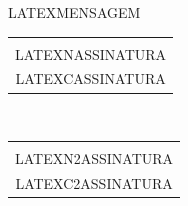 \documentclass[12pt]{artigo_novo}
\begin{document}
\vspace*{.8cm}
\timbrado
\noindent
\begin{linenumbers}
LATEXMENSAGEM 
\end{linenumbers}
\vspace*{15mm} 
\begin{center} 
\setlength{\baselineskip}{6mm}
\begin{tabular}{c}
\hline \vspace*{-4mm} \\
LATEXNASSINATURA \\
{\small LATEXCASSINATURA}
\end{tabular} \\
\vspace*{15mm} 
\begin{tabular}{c}
\hline \vspace*{-4mm} \\
LATEXN2ASSINATURA \\
{\small LATEXC2ASSINATURA}
\end{tabular}
%
\end{center}
\end{document}
